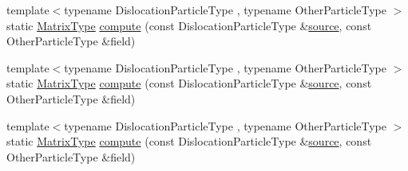 \begin{DoxyCompactItemize}
\item 
{\footnotesize template$<$typename Dislocation\+Particle\+Type , typename Other\+Particle\+Type $>$ }\\static \hyperlink{structmodel_1_1_dislocation_stress_a58cfb5429639657d58da42d9c3854505}{Matrix\+Type} \hyperlink{structmodel_1_1_dislocation_stress_ab17e793610d9ce7519e2afb10c6ff35c}{compute} (const Dislocation\+Particle\+Type \&\hyperlink{plot_network_8m_a6f3223812eea666f1fee426db5c8c563}{source}, const Other\+Particle\+Type \&field)
\item 
{\footnotesize template$<$typename Dislocation\+Particle\+Type , typename Other\+Particle\+Type $>$ }\\static \hyperlink{structmodel_1_1_dislocation_stress_a58cfb5429639657d58da42d9c3854505}{Matrix\+Type} \hyperlink{structmodel_1_1_dislocation_stress_ab17e793610d9ce7519e2afb10c6ff35c}{compute} (const Dislocation\+Particle\+Type \&\hyperlink{plot_network_8m_a6f3223812eea666f1fee426db5c8c563}{source}, const Other\+Particle\+Type \&field)
\item 
{\footnotesize template$<$typename Dislocation\+Particle\+Type , typename Other\+Particle\+Type $>$ }\\static \hyperlink{structmodel_1_1_dislocation_stress_a58cfb5429639657d58da42d9c3854505}{Matrix\+Type} \hyperlink{structmodel_1_1_dislocation_stress_ab17e793610d9ce7519e2afb10c6ff35c}{compute} (const Dislocation\+Particle\+Type \&\hyperlink{plot_network_8m_a6f3223812eea666f1fee426db5c8c563}{source}, const Other\+Particle\+Type \&field)
\end{DoxyCompactItemize}
